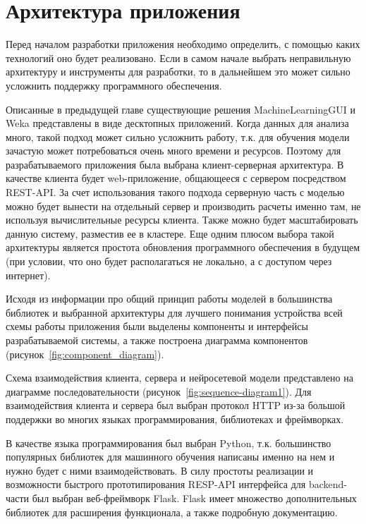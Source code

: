 

\section{Архитектура приложения}
Перед началом разработки приложения необходимо определить, с помощью каких технологий оно будет реализовано. Если в самом начале выбрать неправильную архитектуру и инструменты для разработки, то в дальнейшем это может сильно усложнить поддержку программного обеспечения.


Описанные в предыдущей главе существующие решения MachineLearningGUI и Weka представлены в виде десктопных приложений. Когда данных для анализа много, такой подход может сильно усложнить работу, т.к. для обучения модели зачастую может потребоваться очень много времени и ресурсов. Поэтому для разрабатываемого приложения была выбрана клиент-серверная архитектура. В качестве клиента будет web-приложение, общающееся с сервером посредством REST-API. За счет использования такого подхода серверную часть с моделью можно будет вынести на отдельный сервер и производить расчеты именно там, не используя вычислительные ресурсы клиента. Также можно будет масштабировать данную систему, разместив ее в кластере. Еще одним плюсом выбора такой архитектуры является простота обновления программного обеспечения в будущем (при условии, что оно будет располагаться не локально, а с доступом через интернет).


Исходя из информации про общий принцип работы моделей в большинства библиотек и выбранной архитектуры для лучшего понимания устройства всей схемы работы приложения были выделены компоненты и интерфейсы разрабатываемой системы, а также построена диаграмма компонентов (рисунок~\ref{fig:component_diagram}).




Схема взаимодействия клиента, сервера и нейросетевой модели представлено на диаграмме последовательности (рисунок~\ref{fig:sequence-diagram1}). Для взаимодействия клиента и сервера был выбран протокол HTTP из-за большой поддержки во многих языках программирования, библиотеках и фреймворках.




В качестве языка программирования был выбран Python, т.к. большинство популярных библиотек для машинного обучения написаны именно на нем и нужно будет с ними взаимодействовать. В силу простоты реализации и возможности быстрого прототипирования RESP-API интерфейса для backend-части был выбран веб-фреймворк Flask. Flask имеет множество дополнительных библиотек для расширения функционала, а также подробную документацию.


